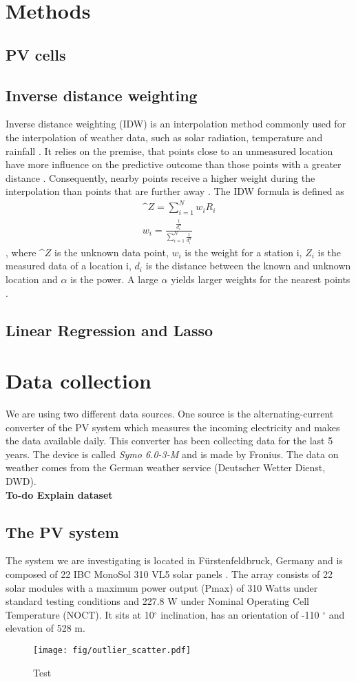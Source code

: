 \documentclass{article}
\begin{document}
\section{Methods}
\subsection{PV cells}
\subsection{Inverse distance weighting}
Inverse distance weighting (IDW) is an interpolation method commonly used for the interpolation of weather data, such as solar radiation, temperature and rainfall \cite{Loghmari2018} \cite{Cao2009} \cite{Chen2012}. It relies on the premise, that points close to an unmeasured location have more influence on the predictive outcome than those points with a greater distance \cite{Chen2012}. Consequently, nearby points receive a higher weight during the interpolation than points that are further away \cite{Lu2008}. The IDW formula is defined as
\begin{align}
    \^{Z} = \sum_{i=1}^N w_iR_i \\
    w_i = \frac{\frac{1}{d_i^\alpha}}{\sum_{i=1}^N \frac{1}{d_i^\alpha}}
\end{align} \cite{Chen2012}, where $\^{Z}$ is the unknown data point, $w_i$ is the weight for a station i, $Z_i$ is the measured data of a location i, $d_i$ is the distance between the known and unknown location and $\alpha$ is the power. A large $\alpha$ yields larger weights for the nearest points \cite{Lu2008}.
\subsection{Linear Regression and Lasso}
\section{Data collection}
We are using two different data sources. One source is the alternating-current converter of the PV system which measures the incoming electricity and makes the data available daily.
This converter has been collecting data for the last 5 years. The device is called \textit{Symo 6.0-3-M} and is made by Fronius.
The data on weather comes from the German weather service (Deutscher Wetter Dienst, DWD).\\
\textbf{To-do Explain dataset}\\
\subsection{The PV system}
The system we are investigating is located in Fürstenfeldbruck, Germany and is composed of 22 IBC MonoSol 310 VL5 solar panels \cite{MonoSol}.
The array consists of 22 solar modules with a maximum power output (Pmax) of 310 Watts under standard testing conditions and 227.8 W  under Nominal Operating Cell Temperature (NOCT).
It sits at 10$^\circ$ inclination, has an orientation of -110 $^\circ$ and elevation of 528 m.
\begin{figure*}
	\texttt{[image: fig/outlier\_scatter.pdf]}
	\caption{Test}
\end{figure*}
\end{document}
